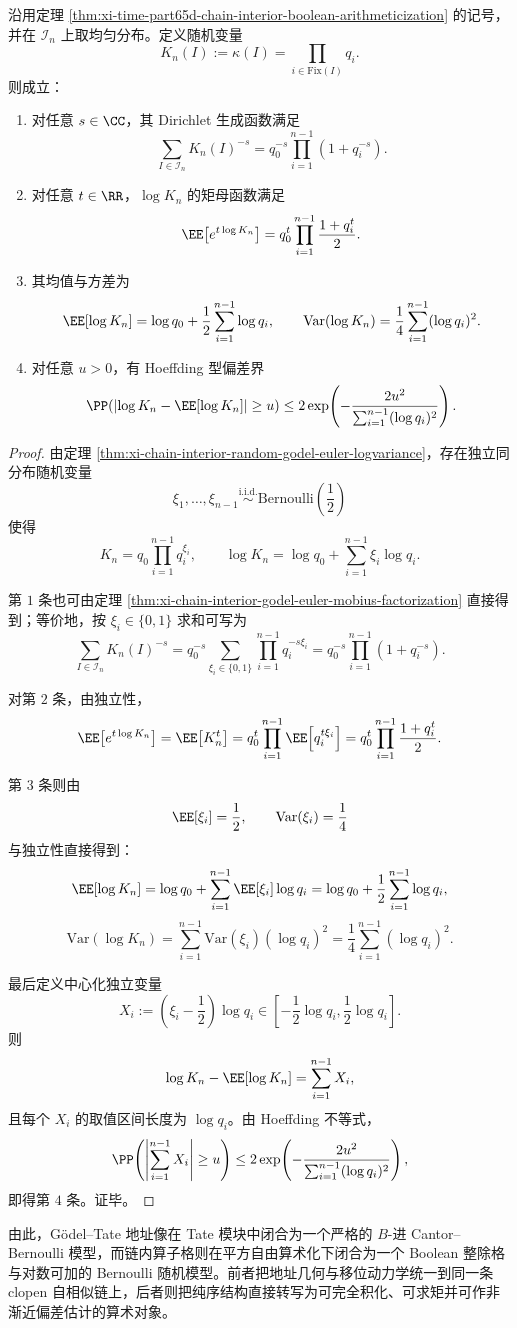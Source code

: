 \begin{theorem}\label{thm:xi-time-part65d-chain-interior-dirichlet-mgf-hoeffding}
沿用定理 \ref{thm:xi-time-part65d-chain-interior-boolean-arithmeticization} 的记号，并在 \(\mathcal I_n\) 上取均匀分布。定义随机变量
\[
K_n(I):=\kappa(I)=\prod_{i\in \mathrm{Fix}(I)}q_i.
\]
则成立：
\begin{enumerate}
  \item 对任意 \(s\in \CC\)，其 Dirichlet 生成函数满足
  \[
  \sum_{I\in \mathcal I_n}K_n(I)^{-s}
  =
  q_0^{-s}\prod_{i=1}^{n-1}(1+q_i^{-s}).
  \]
  \item 对任意 \(t\in \RR\)，\(\log K_n\) 的矩母函数满足
  \[
  \EE\!\left[e^{t\log K_n}\right]
  =
  q_0^t\prod_{i=1}^{n-1}\frac{1+q_i^t}{2}.
  \]
  \item 其均值与方差为
  \[
  \EE[\log K_n]
  =
  \log q_0+\frac12\sum_{i=1}^{n-1}\log q_i,
  \qquad
  \mathrm{Var}(\log K_n)
  =
  \frac14\sum_{i=1}^{n-1}(\log q_i)^2.
  \]
  \item 对任意 \(u>0\)，有 Hoeffding 型偏差界
  \[
  \PP\!\left(\left|\log K_n-\EE[\log K_n]\right|\ge u\right)
  \le
  2\exp\!\left(
  -\frac{2u^2}{\sum_{i=1}^{n-1}(\log q_i)^2}
  \right).
  \]
\end{enumerate}
\end{theorem}
\begin{proof}
由定理 \ref{thm:xi-chain-interior-random-godel-euler-logvariance}，存在独立同分布随机变量
\[
\xi_1,\dots,\xi_{n-1}\stackrel{\mathrm{i.i.d.}}{\sim}\mathrm{Bernoulli}\!\left(\frac12\right)
\]
使得
\[
K_n=q_0\prod_{i=1}^{n-1}q_i^{\xi_i},
\qquad
\log K_n=\log q_0+\sum_{i=1}^{n-1}\xi_i\log q_i.
\]

第 \(1\) 条也可由定理 \ref{thm:xi-chain-interior-godel-euler-mobius-factorization} 直接得到；等价地，按 \(\xi_i\in\{0,1\}\) 求和可写为
\[
\sum_{I\in \mathcal I_n}K_n(I)^{-s}
=
q_0^{-s}\sum_{\xi_i\in\{0,1\}}
\prod_{i=1}^{n-1}q_i^{-s\xi_i}
=
q_0^{-s}\prod_{i=1}^{n-1}(1+q_i^{-s}).
\]

对第 \(2\) 条，由独立性，
\[
\EE\!\left[e^{t\log K_n}\right]
=
\EE\!\left[K_n^t\right]
=
q_0^t\prod_{i=1}^{n-1}\EE\!\left[q_i^{t\xi_i}\right]
=
q_0^t\prod_{i=1}^{n-1}\frac{1+q_i^t}{2}.
\]

第 \(3\) 条则由
\[
\EE[\xi_i]=\frac12,
\qquad
\mathrm{Var}(\xi_i)=\frac14
\]
与独立性直接得到：
\[
\EE[\log K_n]
=
\log q_0+\sum_{i=1}^{n-1}\EE[\xi_i]\log q_i
=
\log q_0+\frac12\sum_{i=1}^{n-1}\log q_i,
\]
\[
\mathrm{Var}(\log K_n)
=
\sum_{i=1}^{n-1}\mathrm{Var}(\xi_i)(\log q_i)^2
=
\frac14\sum_{i=1}^{n-1}(\log q_i)^2.
\]

最后定义中心化独立变量
\[
X_i:=\left(\xi_i-\frac12\right)\log q_i
\in
\left[-\frac12\log q_i,\frac12\log q_i\right].
\]
则
\[
\log K_n-\EE[\log K_n]=\sum_{i=1}^{n-1}X_i,
\]
且每个 \(X_i\) 的取值区间长度为 \(\log q_i\)。由 Hoeffding 不等式，
\[
\PP\!\left(\left|\sum_{i=1}^{n-1}X_i\right|\ge u\right)
\le
2\exp\!\left(
-\frac{2u^2}{\sum_{i=1}^{n-1}(\log q_i)^2}
\right),
\]
即得第 \(4\) 条。证毕。
\end{proof}

\noindent
由此，Gödel--Tate 地址像在 Tate 模块中闭合为一个严格的 \(B\)-进 Cantor--Bernoulli 模型，而链内算子格则在平方自由算术化下闭合为一个 Boolean 整除格与对数可加的 Bernoulli 随机模型。前者把地址几何与移位动力学统一到同一条 clopen 自相似链上，后者则把纯序结构直接转写为可完全积化、可求矩并可作非渐近偏差估计的算术对象。

\endinput
